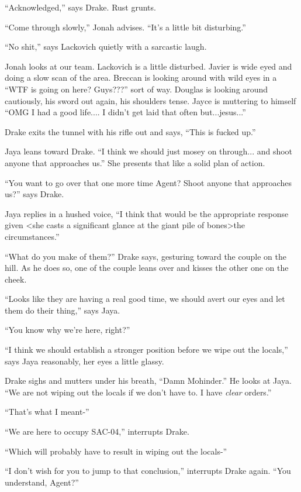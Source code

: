 ``Acknowledged,'' says Drake. Rust grunts.

``Come through slowly,'' Jonah advises.  ``It's a little bit disturbing.''

``No shit,'' says Lackovich quietly with a sarcastic laugh.



Jonah looks at our team.  Lackovich is a little disturbed.  Javier is wide eyed and doing a slow scan of the area.  Breccan is looking around with wild eyes in a ``WTF is going on here?  Guys???'' sort of way.  Douglas is looking around cautiously, his sword out again, his shoulders tense.  Jayce is muttering to himself ``OMG I had a good life.... I didn't get laid that often but...jesus...''



Drake exits the tunnel with his rifle out and says, ``This is fucked up.''

Jaya leans toward Drake.  ``I think we should just mosey on through... and shoot anyone that approaches us.''  She presents that like a solid plan of action.

``You want to go over that one more time Agent?  Shoot anyone that approaches us?'' says Drake.

Jaya replies in a hushed voice, ``I think that would be the appropriate response given \textless she casts a significant glance at the giant pile of bones\textgreater  the circumstances.''

``What do you make of them?'' Drake says, gesturing toward the couple on the hill.  As he does so, one of the couple leans over and kisses the other one on the cheek.

``Looks like they are having a real good time, we should avert our eyes and let them do their thing,'' says Jaya.

``You know why we're here, right?''

``I think we should establish a stronger position before we wipe out the locals,'' says Jaya reasonably, her eyes a little glassy.

Drake sighs and mutters under his breath, ``Damn Mohinder.''  He looks at Jaya.  ``We are not wiping out the locals if we don't have to.  I have \textit{clear} orders.''

``That's what I meant-''

``We are here to occupy SAC-04,'' interrupts Drake.

``Which will probably have to result in wiping out the locals-''

``I don't wish for you to jump to that conclusion,'' interrupts Drake again.  ``You understand, Agent?''

